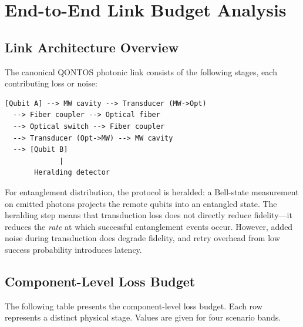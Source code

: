 \documentclass[conference]{IEEEtran}
\begin{document}
\section{End-to-End Link Budget Analysis}

\subsection{Link Architecture Overview}

The canonical QONTOS photonic link consists of the following stages, each contributing loss or noise:

\begin{lstlisting}
[Qubit A] --> MW cavity --> Transducer (MW->Opt)
  --> Fiber coupler --> Optical fiber
  --> Optical switch --> Fiber coupler
  --> Transducer (Opt->MW) --> MW cavity
  --> [Qubit B]
             |
       Heralding detector
\end{lstlisting}

For entanglement distribution, the protocol is heralded: a Bell-state measurement on emitted photons projects the remote qubits into an entangled state. The heralding step means that transduction loss does not directly reduce fidelity---it reduces the \emph{rate} at which successful entanglement events occur. However, added noise during transduction does degrade fidelity, and retry overhead from low success probability introduces latency.

\subsection{Component-Level Loss Budget}

The following table presents the component-level loss budget. Each row represents a distinct physical stage. Values are given for four scenario bands.
\end{document}
